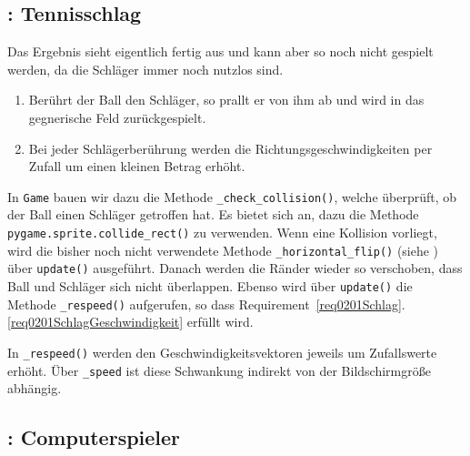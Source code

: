 \subsection{: Tennisschlag}

Das Ergebnis sieht eigentlich fertig aus und kann aber so noch nicht gespielt werden, da die Schläger immer noch nutzlos sind.


\begin{enumerate}
	\item Berührt der Ball den Schläger, so prallt er von ihm ab und wird in das gegnerische Feld zurückgespielt.\label{req0201SchlagZurück}
	\item Bei jeder Schlägerberührung werden die Richtungsgeschwindigkeiten per Zufall um einen kleinen Betrag erhöht.\label{req0201SchlagGeschwindigkeit}
\end{enumerate}
\er

In \texttt{Game} bauen wir dazu die Methode \texttt{\_check\_collision()}, welche überprüft, ob der Ball einen Schläger getroffen hat. Es bietet sich an, dazu die Methode \texttt{ pygame\-.sprite\-.coll\-ide\_rect()} zu verwenden. Wenn eine Kollision vorliegt, wird die bisher noch nicht verwendete Methode \texttt{\_horizontal\_flip()} (siehe ) über \texttt{update()} ausgeführt. Danach werden die Ränder wieder so verschoben, dass Ball und Schläger sich nicht überlappen. Ebenso wird über \texttt{update()} die Methode \texttt{\_respeed()} aufgerufen, so dass Requirement~\ref{req0201Schlag}.\ref{req0201SchlagGeschwindigkeit} erfüllt wird.


In \texttt{\_respeed()} werden den Geschwindigkeitsvektoren jeweils um Zufallswerte erhöht. Über \texttt{\_speed} ist diese Schwankung indirekt von der Bildschirmgröße abhängig. 



\subsection{: Computerspieler}

